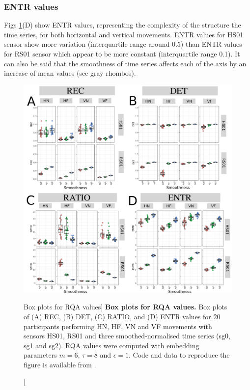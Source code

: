 \documentclass[fleqn,10pt]{wlscirep}
\begin{document}
\subsubsection*{ENTR values}
Figs \ref{fig:RQABP}(D) show ENTR values, representing the complexity of 
the structure the time series, for both horizontal and vertical movements.
ENTR values for HS01 sensor show more variation 
(interquartile range around 0.5)
than ENTR values for RS01 sensor which appear 
to be more constant (interquartile range 0.1).
It can also be said that the smoothness of time series affects
each of the axis by an increase of mean values (see gray rhombos).


\begin{figure}
\centering
\includegraphics[width=1.0\textwidth]{figures/rqa/pdf/rqa-bp}
    \caption
	[Box plots for RQA values]{
	{\bf Box plots for RQA values.}
	Box plots of (A) REC, (B) DET, (C) RATIO, and (D) ENTR values 
	for 20 participants performing HN, HF, VN and VF movements
	with sensors HS01, RS01 and three smoothed-normalised  
	time series (sg0, sg1 and sg2).
	RQA values were computed with 
	embedding parameters $m=6$, $\tau=8$ and $\epsilon=1$.
	Code and data to reproduce the figure is available from \cite{srep2019}.
        }
    \label{fig:RQABP}
\end{figure}
\end{document}
